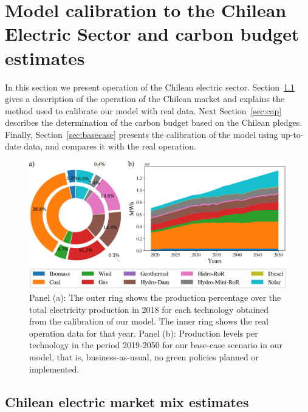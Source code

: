 \documentclass[11pt, letterpaper]{article}
\begin{document}
\section{Model calibration to the Chilean Electric Sector and carbon budget estimates}

In this section we present operation of the Chilean electric sector. Section~\ref{sec:chiledata} gives a description of the operation of the Chilean market and explains the method used to calibrate our model with real data. Next Section~\ref{sec:cap} describes the determination of the carbon budget based on the Chilean pledges. Finally, Section~\ref{sec:basecase} presents the calibration of the model using up-to-date data, and compares it with the real operation.



\begin{figure}[ht!]
 \includegraphics[width=\textwidth]{draft_paper/Figures/Figure1_comp.png}
 \caption{\color{red}Panel (a): The outer ring shows the production percentage over the total electricity production in 2018 for each technology  obtained from the calibration of our model. The inner ring shows the real operation data for that year. Panel (b): Production levels per technology in the period 2019-2050 for our base-case scenario in our model, that is, business-as-usual, no green policies planned or implemented. }
  \label{fig:bc}
  \end{figure}


\subsection{Chilean electric market mix estimates}\label{sec:chiledata}
\end{document}
